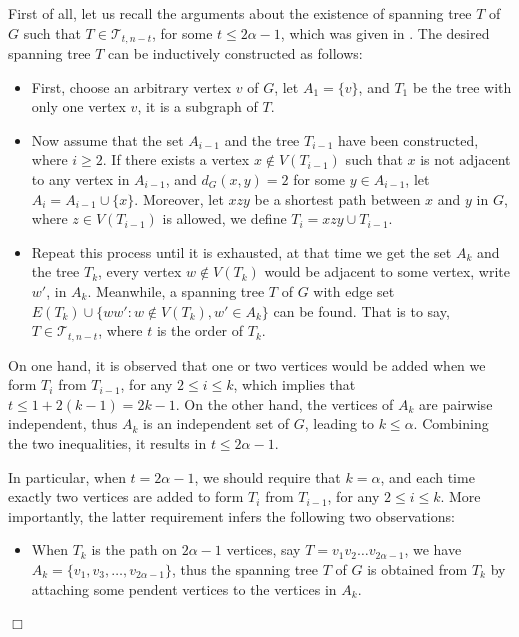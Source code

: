 \documentclass[12pt]{article}
\newenvironment {Proof} {\noindent {\bf Proof.}}{\hspace*{\fill}$\Box$\par\vspace{4mm}}
\begin{document}
\begin{Proof}
First of all, let us recall the arguments about the existence of spanning tree $T$ of $G$ such that $T \in \mathcal{T}_{t, n-t}$, for some $t \le 2 \alpha - 1$, which was given in \cite{Muk14}. The desired spanning tree $T$ can be inductively constructed as follows:
\begin{itemize}

\item
First, choose an arbitrary vertex $v$ of $G$,  let $A_1 = \{v\}$, and
$T_1$ be the tree with only one vertex $v$, it is  a subgraph of $T$.

\item

Now assume that the set $A_{i-1}$ and the tree $T_{i-1}$ have been constructed, where $i \ge 2$.
If there exists a vertex $x \not\in V(T_{i-1})$ such that $x$ is not adjacent to any vertex in $A_{i-1}$, and $d_G(x, y) = 2$ for some $y \in A_{i-1}$, let $A_i = A_{i-1} \cup \{x\}$. Moreover, let
$xzy$ be a shortest path between $x$ and $y$ in $G$, where $z\in V(T_{i-1})$ is allowed, we define $T_i = xzy \cup T_{i-1}$.

\item
Repeat this process until it is exhausted, at that time we get the set $A_k$ and the tree $T_k$, every vertex $w \not\in V(T_k)$ would be adjacent to some vertex, write $w'$, in $A_k$.
Meanwhile, a spanning tree $T$ of $G$ with edge set $E(T_k) \cup \{ww' : w \not\in V(T_k), w' \in A_k\}$ can be found.
That is to say, $T \in \mathcal{T}_{t, n-t}$, where $t$ is the order of $T_k$.
\end{itemize}

On one hand, it is observed that one or two vertices would be added when we form $T_i$ from $T_{i-1}$, for any $2 \le i \le k$, which implies that $t \le 1 + 2 (k - 1) = 2k - 1$. On the other hand, the vertices of $A_k$ are pairwise independent, thus $A_k$ is an independent set of $G$, leading to $k \le \alpha$. Combining the two inequalities, it results in $t \le 2\alpha - 1$.

In particular, when $t = 2\alpha - 1$, we should require that $k = \alpha$, and each time exactly two vertices are added to form $T_i$ from $T_{i-1}$, for any $2 \le i \le k$. More importantly, the latter requirement infers the following two observations:
\begin{itemize}

\item

When $T_k$ is the path on $2\alpha - 1$ vertices, say $T = v_1 v_2 \dots v_{2 \alpha - 1}$, we have $A_{k} = \{v_1, v_3, \dots, v_{2 \alpha - 1}\}$, thus the spanning tree $T$ of $G$ is obtained from $T_k$ by attaching some pendent vertices  to the vertices in  $A_{k}$.


\end{itemize}
\end{Proof}
\end{document}
